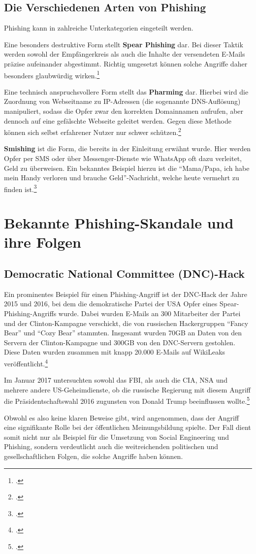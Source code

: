 \documentclass[12pt, a4paper, oneside]{scrartcl}
\begin{document}
\subsection{Die Verschiedenen Arten von Phishing}
Phishing kann in zahlreiche Unterkategorien eingeteilt werden. 
\par
Eine besonders destruktive Form stellt \textbf{Spear Phishing} dar. Bei dieser Taktik werden sowohl der Empfängerkreis als auch 
die Inhalte der versendeten E-Mails präzise aufeinander abgestimmt. Richtig umgesetzt können 
solche Angriffe daher besonders glaubwürdig wirken.\footcite{IBM_Phishing}
\par
Eine technisch anspruchsvollere Form stellt das \textbf{Pharming} dar. Hierbei wird die Zuordnung von Webseitname zu 
IP-Adressen (die sogenannte DNS-Auflösung) manipuliert, sodass die Opfer zwar den korrekten Domainnamen aufrufen, aber dennoch auf eine gefälschte
Webseite geleitet werden. Gegen diese Methode können sich selbst erfahrener Nutzer nur schwer schützen.\footcite{Bayern_Phaming}
\par
\textbf{Smishing} ist die Form, die bereits in der Einleitung erwähnt wurde. Hier werden Opfer per SMS oder über 
Messenger-Dienste wie WhatsApp oft dazu verleitet, Geld zu überweisen. Ein bekanntes Beispiel hierzu ist die  
``Mama/Papa, ich habe mein Handy verloren und brauche Geld''-Nachricht, welche heute vermehrt zu finden ist.\footcite{CS_10Arten}\\

\section{Bekannte Phishing-Skandale und ihre Folgen}

\subsection{Democratic National Committee (DNC)-Hack}
Ein prominentes Beispiel für einen Phishing-Angriff ist der DNC-Hack der Jahre 2015 und 2016, 
bei dem die demokratische Partei der USA Opfer eines Spear-Phishing-Angriffs wurde. 
Dabei wurden E-Mails an 300 Mitarbeiter der Partei und der Clinton-Kampagne
verschickt, die von russischen Hackergruppen ``Fancy Bear'' und ``Cozy Bear'' stammten.
Insgesamt wurden 70GB an Daten von den Servern der Clinton-Kampagne und 300GB von den DNC-Servern gestohlen.
Diese Daten wurden zusammen mit knapp 20.000 E-Mails auf WikiLeaks veröffentlicht.\footcite{IDStrong_DNC}
\par
Im Januar 2017 untersuchten sowohl das FBI, als auch die CIA, NSA und mehrere andere US-Geheimdienste, 
ob die russische Regierung mit diesem Angriff die Präsidentschaftswahl 2016 zugunsten von Donald Trump
beeinflussen wollte.\footcite{NYT_DNC}
\par
Obwohl es also keine klaren Beweise gibt, wird angenommen, dass der Angriff eine 
signifikante Rolle bei der öffentlichen Meinungsbildung spielte. Der Fall dient somit nicht 
nur als Beispiel für die Umsetzung von Social Engineering und Phishing, sondern verdeutlicht auch die weitreichenden 
politischen und gesellschaftlichen Folgen, die solche Angriffe haben können.
\end{document}
